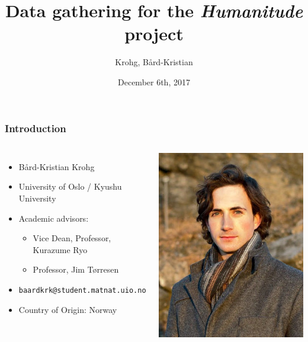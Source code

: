 \documentclass[xcolor=pdftex,dvipsnames,table]{beamer}
\title{Data gathering for the \emph{Humanitude} project}
\author{Krohg, Bård-Kristian}
\date{December 6th, 2017}
\begin{document}
\maketitle

\begin{frame}
  \frametitle{Introduction}
  
  \begin{columns}[c]
    \begin{itemize}
    \item[] Bård-Kristian Krohg 
    \item[] University of Oslo / Kyushu University
    \item[] Academic advisors:\begin{itemize}
    \item[] Vice Dean, Professor, Kurazume Ryo 
    \item[] Professor, Jim Tørresen
    \end{itemize}
    \item[] \Letter \hspace{.3em} \texttt{baardkrk@student.matnat.uio.no} 
    \item[] Country of Origin: Norway
    \end{itemize}

    \includegraphics[width=\linewidth]{graphics/selfie.jpg}
  \end{columns}
\end{frame}
\end{document}

